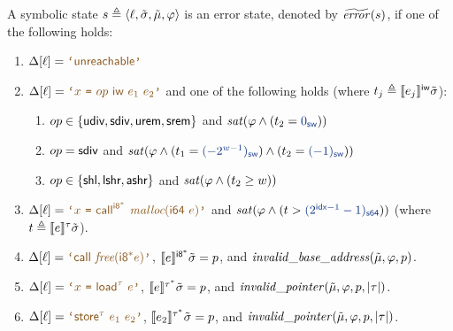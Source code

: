 \begin{definition}
\label{def:sym-error-state}
A symbolic state $s \triangleq \langle{\ell},{\tilde\sigma},{\tilde{\mu}},{\varphi}\rangle$ is an error state, denoted by $\widetilde{\mathit{error}}(s)$,
if one of the following holds:
\begin{enumerate}[left=0pt]
    \item $\instrat{\location} = \textup{$\codequote{\tunreachable}$}$
    \item $\instrat{\location} = \textup{$\codequote{x \ \texttt{=} \ op \ \bvsort{w} \ e_1 \ e_2}$}$ and one of the following holds (where $t_j \triangleq \llbracket e_j \rrbracket^{\textsf{iw}}{\tilde\sigma}$):
    \begin{enumerate}[left=-3pt]
        \item \textup{$op \in \{\textsf{udiv}, \textsf{sdiv}, \textsf{urem}, \textsf{srem}\}$} and $\sat{\pc \land (t_2 = \bvconst{w}{0})}$
        \item \textup{$op = \textsf{sdiv}$} and $\sat{\pc \land (t_1 = \bvconst{w}{(-2^{w - 1})}) \land (t_2 = \bvconst{w}{(-1)})}$
        \item \textup{$op \in \{\textsf{shl}, \textsf{lshr}, \textsf{ashr}\}$} and $\mathit{sat}(\varphi \land (t_2 \geq w))$
    \end{enumerate}
    \item $\instrat{\location} = \textup{$\codequote{x \ \texttt{=} \ \tcall^{\pointertypeof{\bvsort{8}}} \ \intrinsicfunc{malloc}(\bvsort{64} \ e)}$}$ and
        \textup{$\sat{\pc \land (t > \bvconst{64}{(2^{\indexwidth - 1} - 1)})}$} (where $t \triangleq \llbracket e \rrbracket^{\tau}{\tilde\sigma}$).
    \item $\instrat{\location} = \textup{$\codequote{\tcall~\intrinsicfunc{free}(\pointertypeof{\bvsort{8}} e)}$}$, \textup{$\llbracket e \rrbracket^{\mathit{\textsf{i8}^{*}}}{\tilde\sigma} = p$}, and $\mathit{invalid\_base\_address}(\tilde{\mu}, \varphi, p)$.
    \item $\instrat{\location} = \textup{$\codequote{x \ \texttt{=} \ \tload^{\tau} \ e}$}$, \textup{$\llbracket e \rrbracket^{\mathit{\tau^{*}}}{\tilde\sigma} = p$}, and $\mathit{invalid\_pointer}(\tilde{\mu}, \varphi, p, |\tau|)$.
    \item $\instrat{\location} = \textup{$\codequote{\tstore^{\tau} \ e_1 \ e_2}$}$, \textup{$\llbracket e_2 \rrbracket^{\mathit{\tau^{*}}}{\tilde\sigma} = p$}, and $\mathit{invalid\_pointer}(\tilde{\mu}, \varphi, p, |\tau|)$.

\end{enumerate}
\end{definition}
